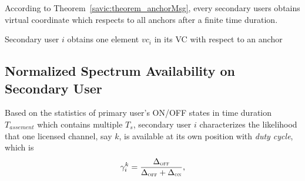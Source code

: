 According to Theorem~\ref{savic:theorem_anchorMsg}, every secondary users obtains virtual coordinate which respects to all anchors after a finite time duration.
\begin{algorithm}[!h]
\caption{Secondary user $i$ obtains one element $vc_i$ in its VC with respect to an anchor}%
\label{algo:receiveAnchorMessage} 
\DontPrintSemicolon
\SetAlgoLined
{}

\end{algorithm}







\subsection{Normalized Spectrum Availability on Secondary User}\label{CA_VC_likelihood}
Based on the statistics of primary user's ON/OFF states in time duration $T_{assement}$ which contains multiple $T_s$, secondary user $i$ characterizes the likelihood that one licensed channel, say $k$, is available at its own position with \textit{duty cycle}, which is
\begin{equation}
\label{gamma}
\gamma_i^k = \frac{\Delta_{\textsc{\tiny OFF}}}{\Delta_{\textsc{\tiny OFF}}+\Delta_{\textsc{\tiny ON}}},
\end{equation}

